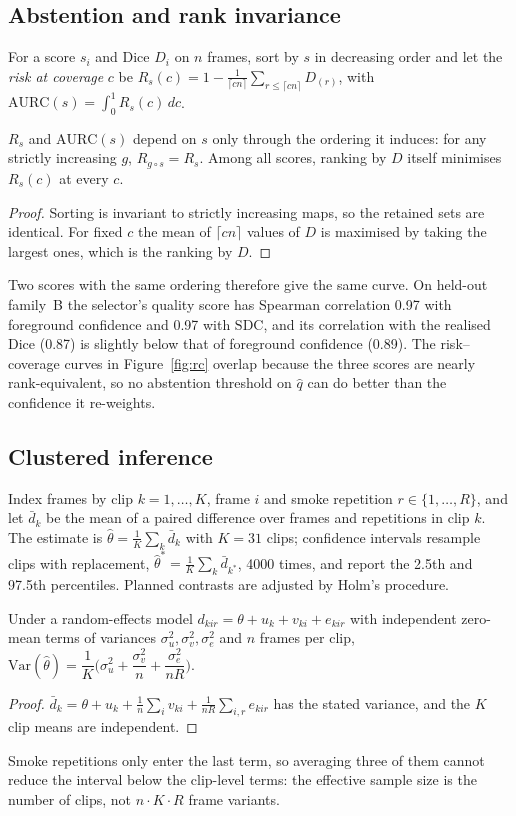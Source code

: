 \documentclass{midl}
\begin{document}
\subsection{Abstention and rank invariance}
For a score $s_i$ and Dice $D_i$ on $n$ frames, sort by $s$ in decreasing order and let the \emph{risk at coverage} $c$ be $R_s(c)=1-\frac{1}{\lceil cn\rceil}\sum_{r\le\lceil cn\rceil}D_{(r)}$, with $\mathrm{AURC}(s)=\int_0^1R_s(c)\,dc$.
\begin{proposition}\label{prop:rank}
$R_s$ and $\mathrm{AURC}(s)$ depend on $s$ only through the ordering it induces: for any strictly increasing $g$, $R_{g\circ s}=R_s$. Among all scores, ranking by $D$ itself minimises $R_s(c)$ at every $c$.
\end{proposition}
\begin{proof}
Sorting is invariant to strictly increasing maps, so the retained sets are identical. For fixed $c$ the mean of $\lceil cn\rceil$ values of $D$ is maximised by taking the largest ones, which is the ranking by $D$.
\end{proof}
\noindent Two scores with the same ordering therefore give the same curve. On held-out family~B the selector's quality score has Spearman correlation 0.97 with foreground confidence and 0.97 with $\mathrm{SDC}$, and its correlation with the realised Dice (0.87) is slightly below that of foreground confidence (0.89). The risk--coverage curves in Figure~\ref{fig:rc} overlap because the three scores are nearly rank-equivalent, so no abstention threshold on $\hat q$ can do better than the confidence it re-weights.

\subsection{Clustered inference}
Index frames by clip $k=1,\dots,K$, frame $i$ and smoke repetition $r\in\{1,\dots,R\}$, and let $\bar d_k$ be the mean of a paired difference over frames and repetitions in clip $k$. The estimate is $\hat\theta=\frac{1}{K}\sum_k\bar d_k$ with $K=31$ clips; confidence intervals resample clips with replacement, $\hat\theta^{*}=\frac{1}{K}\sum_k\bar d_{k^{*}}$, 4000 times, and report the 2.5th and 97.5th percentiles. Planned contrasts are adjusted by Holm's procedure.
\begin{proposition}\label{prop:var}
Under a random-effects model $d_{kir}=\theta+u_k+v_{ki}+e_{kir}$ with independent zero-mean terms of variances $\sigma_u^2,\sigma_v^2,\sigma_e^2$ and $n$ frames per clip, $\mathrm{Var}(\hat\theta)=\dfrac{1}{K}\Big(\sigma_u^2+\dfrac{\sigma_v^2}{n}+\dfrac{\sigma_e^2}{nR}\Big)$.
\end{proposition}
\begin{proof}
$\bar d_k=\theta+u_k+\frac1n\sum_iv_{ki}+\frac{1}{nR}\sum_{i,r}e_{kir}$ has the stated variance, and the $K$ clip means are independent.
\end{proof}
\noindent Smoke repetitions only enter the last term, so averaging three of them cannot reduce the interval below the clip-level terms: the effective sample size is the number of clips, not $n\!\cdot\!K\!\cdot\!R$ frame variants.
\end{document}
